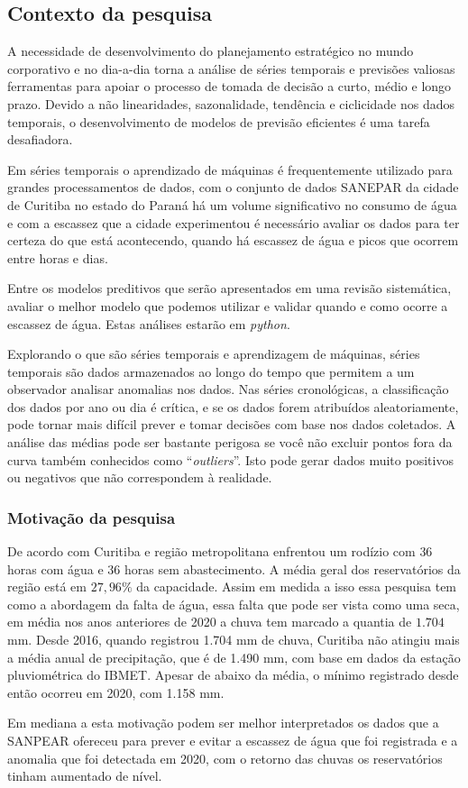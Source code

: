 \subsection{Contexto da pesquisa} \label{subsec:contexto}
 A necessidade de desenvolvimento do planejamento estratégico no mundo corporativo e no dia-a-dia torna a análise de séries temporais e previsões valiosas ferramentas para apoiar o processo de tomada de decisão a curto, médio e longo prazo. Devido a não linearidades, sazonalidade, tendência e ciclicidade nos dados temporais, o desenvolvimento de modelos de previsão eficientes é uma tarefa desafiadora. 

 Em séries temporais o aprendizado de máquinas é frequentemente utilizado para grandes processamentos de dados, com o conjunto de dados SANEPAR da cidade de Curitiba no estado do Paraná há um volume significativo no consumo de água e com a escassez que a cidade experimentou é necessário avaliar os dados para ter certeza do que está acontecendo, quando há escassez de água e picos que ocorrem entre horas e dias.
 
 Entre os modelos preditivos que serão apresentados em uma revisão sistemática, avaliar o melhor modelo que podemos utilizar e validar quando e como ocorre a escassez de água. Estas análises estarão em \textit{python}.
 
 Explorando o que são séries temporais e aprendizagem de máquinas, séries temporais são dados armazenados ao longo do tempo que permitem a um observador analisar anomalias nos dados. Nas séries cronológicas, a classificação dos dados por ano ou dia é crítica, e se os dados forem atribuídos aleatoriamente, pode tornar mais difícil prever e tomar decisões com base nos dados coletados. 
A análise das médias pode ser bastante perigosa se você não excluir pontos fora da curva também conhecidos como ``\textit{outliers}''. Isto pode gerar dados muito positivos ou negativos que não correspondem à realidade.
   
      
\subsubsection{Motiva\c c\~ao da pesquisa} \label{subsubsec:motivacao}
    
    De acordo com \cite{vasconcelos_2020} Curitiba e região metropolitana enfrentou um rodízio com $36$ horas com água e $36$ horas sem abastecimento. A média geral dos reservatórios da região está em $27,96\%$ da capacidade. Assim em medida a isso essa pesquisa tem como a abordagem da falta de água, essa falta que pode ser vista como uma seca, em média nos anos anteriores de 2020 a chuva tem marcado a quantia de $1.704$ mm. \cite{vasconcelos_2020} Desde 2016, quando registrou 1.704 mm de chuva, Curitiba não atingiu mais a média anual de precipitação, que é de 1.490 mm, com base em dados da estação pluviométrica do IBMET.  Apesar de abaixo da média, o mínimo registrado desde então ocorreu em 2020, com 1.158 mm.
    
    Em mediana a esta motivação podem ser melhor interpretados os dados que a SANPEAR ofereceu para prever e evitar a escassez de água que foi registrada e a anomalia que foi detectada em 2020, com o retorno das chuvas os reservatórios tinham aumentado de nível.
    